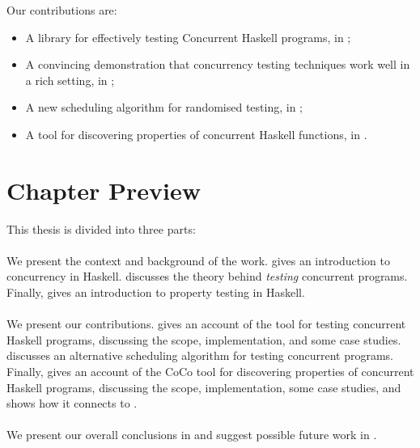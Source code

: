 Our contributions are:

\begin{itemize}
\item A library for effectively testing Concurrent Haskell programs,
  in ;
\item A convincing demonstration that concurrency testing techniques
  work well in a rich setting, in ;
\item A new scheduling algorithm for randomised testing, in
  ;
\item A tool for discovering properties of concurrent Haskell
  functions, in .
\end{itemize}

\section{Chapter Preview}
\label{sec:intro-roadmap}

This thesis is divided into three parts:

\paragraph{}
We present the context and background of the work.
 gives an introduction to concurrency in
Haskell.   discusses the theory behind \emph{testing}
concurrent programs.  Finally,  gives an
introduction to property testing in Haskell.

\paragraph{}
We present our contributions.   gives an account of
the \dejafu{} tool for testing concurrent Haskell programs, discussing
the scope, implementation, and some case studies.
 discusses an alternative scheduling algorithm
for testing concurrent programs.  Finally,  gives an
account of the CoCo tool for discovering properties of concurrent
Haskell programs, discussing the scope, implementation, some case
studies, and shows how it connects to \dejafu{}.

\paragraph{}
We present our overall conclusions in  and
suggest possible future work in .
